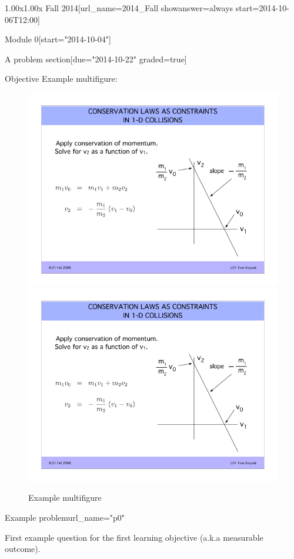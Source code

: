 \documentclass[12pt]{article}
\begin{document}
\begin{edXcourse}{1.00x}{1.00x Fall 2014}[url_name=2014_Fall showanswer=always start=2014-10-06T12:00]
\begin{edXchapter*}{Module 0}[start="2014-10-04"]
\begin{edXsequential}{A problem section}[due="2014-10-22" graded=true]
\begin{edXtext}{Objective}
Example multifigure:
\begin{figure}
  \begin{center}
    \includegraphics{example-image.png}
    \hfill
    \includegraphics{example-image.png}
    \caption{Example multifigure}
    \label{fig:multi}
  \end{center}
\end{figure}

\end{edXtext}

\begin{edXproblem}{Example problem}{url_name="p0"}

First example question for the first learning objective (a.k.a measurable outcome).


\end{edXproblem}
\end{edXsequential}
\end{edXchapter*}
\end{edXcourse}
\end{document}
